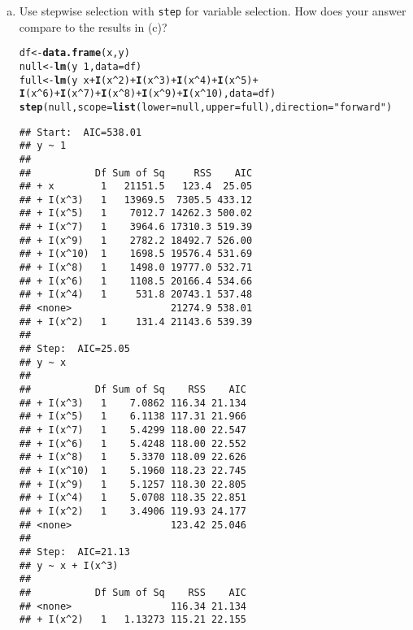 \documentclass[12pt]{article}\usepackage[]{graphicx}\usepackage[]{color}
\makeatletter
\newcommand{\hlnum}[1]{\textcolor[rgb]{0.686,0.059,0.569}{#1}}%
\newcommand{\hlstr}[1]{\textcolor[rgb]{0.192,0.494,0.8}{#1}}%
\newcommand{\hlopt}[1]{\textcolor[rgb]{0,0,0}{#1}}%
\newcommand{\hlstd}[1]{\textcolor[rgb]{0.345,0.345,0.345}{#1}}%
\newcommand{\hlkwb}[1]{\textcolor[rgb]{0.69,0.353,0.396}{#1}}%
\newcommand{\hlkwc}[1]{\textcolor[rgb]{0.333,0.667,0.333}{#1}}%
\newcommand{\hlkwd}[1]{\textcolor[rgb]{0.737,0.353,0.396}{\textbf{#1}}}%
\newenvironment{kframe}{%
 \def\at@end@of@kframe{}%
 \ifinner\ifhmode%
  \def\at@end@of@kframe{\end{minipage}}%
  \begin{minipage}{\columnwidth}%
 \fi\fi%
 \def\FrameCommand##1{\hskip\@totalleftmargin \hskip-\fboxsep
 \colorbox{shadecolor}{##1}\hskip-\fboxsep
     \hskip-\linewidth \hskip-\@totalleftmargin \hskip\columnwidth}%
 \MakeFramed {\advance\hsize-\width
   \@totalleftmargin\z@ \linewidth\hsize
   \@setminipage}}%
 {\par\unskip\endMakeFramed%
 \at@end@of@kframe}
\newenvironment{knitrout}{}{} %
\theoremstyle{definition}
\makeatother
\begin{document}
\begin{enumerate}[1.]
\begin{enumerate}[(a)]
      \item Use stepwise selection with \texttt{step} for variable selection. How does your answer compare to the results in (c)?
\begin{knitrout}
\color{fgcolor}\begin{kframe}
\begin{alltt}
\hlstd{df} \hlkwb{<-} \hlkwd{data.frame}\hlstd{(x,y)}
\hlstd{null} \hlkwb{<-} \hlkwd{lm}\hlstd{(y}\hlopt{~}\hlnum{1}\hlstd{,} \hlkwc{data} \hlstd{=df)}
\hlstd{full} \hlkwb{<-} \hlkwd{lm}\hlstd{(y} \hlopt{~} \hlstd{x} \hlopt{+} \hlkwd{I}\hlstd{(x}\hlopt{^}\hlnum{2}\hlstd{)}\hlopt{+} \hlkwd{I}\hlstd{(x}\hlopt{^}\hlnum{3}\hlstd{)} \hlopt{+} \hlkwd{I}\hlstd{(x}\hlopt{^}\hlnum{4}\hlstd{)}\hlopt{+} \hlkwd{I}\hlstd{(x}\hlopt{^}\hlnum{5}\hlstd{)}\hlopt{+}
             \hlkwd{I}\hlstd{(x}\hlopt{^}\hlnum{6}\hlstd{)}\hlopt{+} \hlkwd{I}\hlstd{(x}\hlopt{^}\hlnum{7}\hlstd{)}\hlopt{+} \hlkwd{I}\hlstd{(x}\hlopt{^}\hlnum{8}\hlstd{)}\hlopt{+} \hlkwd{I}\hlstd{(x}\hlopt{^}\hlnum{9}\hlstd{)}\hlopt{+} \hlkwd{I}\hlstd{(x}\hlopt{^}\hlnum{10}\hlstd{),} \hlkwc{data} \hlstd{= df)}
\hlkwd{step}\hlstd{( null,}\hlkwc{scope}\hlstd{=}\hlkwd{list}\hlstd{(}\hlkwc{lower}\hlstd{=null,} \hlkwc{upper}\hlstd{=full),} \hlkwc{direction}\hlstd{=}\hlstr{"forward"}\hlstd{)}
\end{alltt}
\begin{verbatim}
## Start:  AIC=538.01
## y ~ 1
## 
##           Df Sum of Sq     RSS    AIC
## + x        1   21151.5   123.4  25.05
## + I(x^3)   1   13969.5  7305.5 433.12
## + I(x^5)   1    7012.7 14262.3 500.02
## + I(x^7)   1    3964.6 17310.3 519.39
## + I(x^9)   1    2782.2 18492.7 526.00
## + I(x^10)  1    1698.5 19576.4 531.69
## + I(x^8)   1    1498.0 19777.0 532.71
## + I(x^6)   1    1108.5 20166.4 534.66
## + I(x^4)   1     531.8 20743.1 537.48
## <none>                 21274.9 538.01
## + I(x^2)   1     131.4 21143.6 539.39
## 
## Step:  AIC=25.05
## y ~ x
## 
##           Df Sum of Sq    RSS    AIC
## + I(x^3)   1    7.0862 116.34 21.134
## + I(x^5)   1    6.1138 117.31 21.966
## + I(x^7)   1    5.4299 118.00 22.547
## + I(x^6)   1    5.4248 118.00 22.552
## + I(x^8)   1    5.3370 118.09 22.626
## + I(x^10)  1    5.1960 118.23 22.745
## + I(x^9)   1    5.1257 118.30 22.805
## + I(x^4)   1    5.0708 118.35 22.851
## + I(x^2)   1    3.4906 119.93 24.177
## <none>                 123.42 25.046
## 
## Step:  AIC=21.13
## y ~ x + I(x^3)
## 
##           Df Sum of Sq    RSS    AIC
## <none>                 116.34 21.134
## + I(x^2)   1   1.13273 115.21 22.155

\end{verbatim}
\end{kframe}
\end{knitrout}
\end{enumerate}
\end{enumerate}
\end{document}
